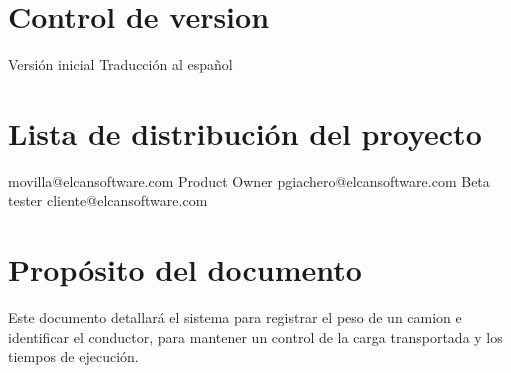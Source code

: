 \section{Control de version}
\begin{elcanversions}
	 {Versión inicial}
	 {Traducción al español}
\end{elcanversions}

\section{Lista de distribución del proyecto}

\begin{elcandistribution}
	 {movilla@elcansoftware.com} {\distribdate} 
	 {Product Owner} {pgiachero@elcansoftware.com} {\distribdate}
	 {Beta tester} {cliente@elcansoftware.com}{\distribdate}
\end{elcandistribution}

\section{Propósito del documento}
Este documento detallar\'a el sistema para registrar el peso de un camion e identificar el conductor, para mantener un control de la carga transportada y los tiempos de ejecuci\'on.

